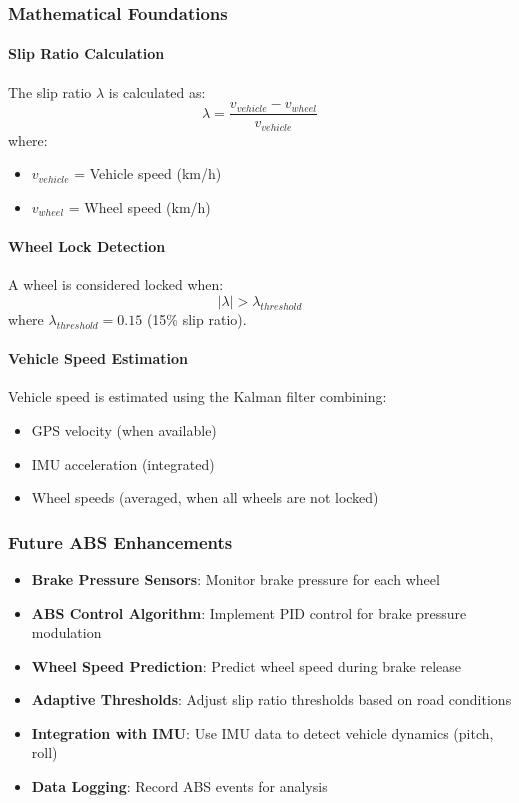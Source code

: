 \documentclass[11pt,a4paper]{article}
\begin{document}
\subsubsection{Mathematical Foundations}

\paragraph{Slip Ratio Calculation}
The slip ratio $\lambda$ is calculated as:
\begin{equation}
\lambda = \frac{v_{vehicle} - v_{wheel}}{v_{vehicle}}
\end{equation}
where:
\begin{itemize}
    \item $v_{vehicle}$ = Vehicle speed (km/h)
    \item $v_{wheel}$ = Wheel speed (km/h)
\end{itemize}

\paragraph{Wheel Lock Detection}
A wheel is considered locked when:
\begin{equation}
|\lambda| > \lambda_{threshold}
\end{equation}
where $\lambda_{threshold} = 0.15$ (15\% slip ratio).

\paragraph{Vehicle Speed Estimation}
Vehicle speed is estimated using the Kalman filter combining:
\begin{itemize}
    \item GPS velocity (when available)
    \item IMU acceleration (integrated)
    \item Wheel speeds (averaged, when all wheels are not locked)
\end{itemize}

\subsubsection{Future ABS Enhancements}

\begin{itemize}
    \item \textbf{Brake Pressure Sensors}: Monitor brake pressure for each wheel
    \item \textbf{ABS Control Algorithm}: Implement PID control for brake pressure modulation
    \item \textbf{Wheel Speed Prediction}: Predict wheel speed during brake release
    \item \textbf{Adaptive Thresholds}: Adjust slip ratio thresholds based on road conditions
    \item \textbf{Integration with IMU}: Use IMU data to detect vehicle dynamics (pitch, roll)
    \item \textbf{Data Logging}: Record ABS events for analysis
\end{itemize}
\end{document}
